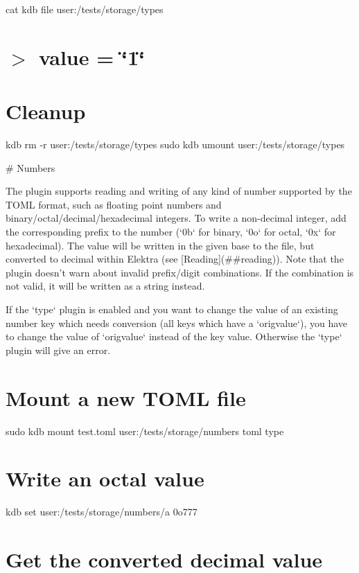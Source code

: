 cat {\ttfamily kdb file user\+:/tests/storage/types} \hypertarget{autotoc_md635_autotoc_md666}{}\section{$>$ value = \char`\"{}1\char`\"{}}\label{autotoc_md635_autotoc_md666}
\hypertarget{autotoc_md635_autotoc_md667}{}\section{Cleanup}\label{autotoc_md635_autotoc_md667}
kdb rm -\/r user\+:/tests/storage/types sudo kdb umount user\+:/tests/storage/types 
\begin{DoxyCode}
# Numbers

The plugin supports reading and writing of any kind of number supported by the TOML format, such as
       floating point numbers and binary/octal/decimal/hexadecimal integers.
To write a non-decimal integer, add the corresponding prefix to the number (`0b` for binary, `0o` for
       octal, `0x` for hexadecimal).
The value will be written in the given base to the file, but converted to decimal within Elektra (see
       [Reading](##reading)).
Note that the plugin doesn't warn about invalid prefix/digit combinations. If the combination is not valid,
       it will be written as a string instead.

If the `type` plugin is enabled and you want to change the value of an existing number key which needs
       conversion (all keys which have a `origvalue`),
you have to change the value of `origvalue` instead of the key value. Otherwise the `type` plugin will give
       an error.
\end{DoxyCode}
 \hypertarget{autotoc_md635_autotoc_md668}{}\section{Mount a new T\+O\+M\+L file}\label{autotoc_md635_autotoc_md668}
sudo kdb mount test.\+toml user\+:/tests/storage/numbers toml type\hypertarget{autotoc_md635_autotoc_md669}{}\section{Write an octal value}\label{autotoc_md635_autotoc_md669}
kdb set \textquotesingle{}user\+:/tests/storage/numbers/a\textquotesingle{} \textquotesingle{}0o777\textquotesingle{}\hypertarget{autotoc_md635_autotoc_md670}{}\section{Get the converted decimal value}\label{autotoc_md635_autotoc_md670}
